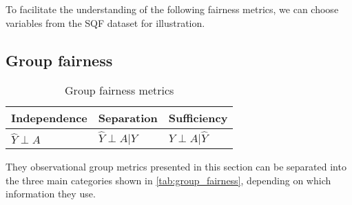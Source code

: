 To facilitate the understanding of the following fairness metrics, we can choose variables from the SQF dataset for illustration.
\subsection{Group fairness}
\begin{table}
    \centering
    \begin{tabular}{lll}
        \toprule
        Independence & Separation & {Sufficiency} \\
        \midrule
        $\hat{Y} \perp A$ & $\hat{Y} \perp A | Y$ & {$Y \perp A | \hat{Y}$}\\
        \bottomrule
    \end{tabular}
    \caption{Group fairness metrics}
    \label{tab:group_fairness}
\end{table}

They observational group metrics presented in this section can be separated into the three main categories shown in \autoref{tab:group_fairness}, depending on which information they use.

